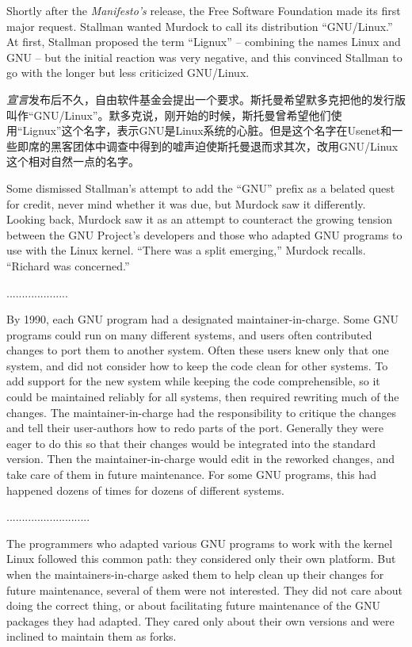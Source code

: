\ifdefined\eng
Shortly after the \textit{Manifesto's} release, the Free Software Foundation made its first major request. Stallman wanted Murdock to call its distribution ``GNU/Linux.'' At first, Stallman proposed the term ``Lignux'' -- combining the names Linux and GNU -- but the initial reaction was very negative, and this convinced Stallman to go with the longer but less criticized GNU/Linux.
\fi

\ifdefined\chs
\textit{宣言}发布后不久，自由软件基金会提出一个要求。斯托曼希望默多克把他的发行版叫作``GNU/Linux''。默多克说，刚开始的时候，斯托曼曾希望他们使用``Lignux''这个名字，表示GNU是Linux系统的心脏。但是这个名字在Usenet和一些即席的黑客团体中调查中得到的嘘声迫使斯托曼退而求其次，改用GNU/Linux这个相对自然一点的名字。
\fi

\ifdefined\eng
Some dismissed Stallman's attempt to add the ``GNU'' prefix as a belated quest for credit, never mind whether it was due, but Murdock saw it differently. Looking back, Murdock saw it as an attempt to counteract the growing tension between the GNU Project's developers and those who adapted GNU programs to use with the Linux kernel. ``There was a split emerging,'' Murdock recalls. ``Richard was concerned.''
\fi

\ifdefined\chs
....................
\fi

\ifdefined\eng
By 1990, each GNU program had a designated maintainer-in-charge.  Some GNU programs could run on many different systems, and users often contributed changes to port them to another system.  Often these users knew only that one system, and did not consider how to keep the code clean for other systems.  To add support for the new system while keeping the code comprehensible, so it could be maintained reliably for all systems, then required rewriting much of the changes.  The maintainer-in-charge had the responsibility to critique the changes and tell their user-authors how to redo parts of the port.  Generally they were eager to do this so that their changes would be integrated into the standard version.  Then the maintainer-in-charge would edit in the reworked changes, and take care of them in future maintenance. For some GNU programs, this had happened dozens of times for dozens
of different systems.
\fi

\ifdefined\chs
...........................
\fi

\ifdefined\eng
The programmers who adapted various GNU programs to work with the kernel Linux followed this common path: they considered only their own platform.  But when the maintainers-in-charge asked them to help clean up their changes for future maintenance, several of them were not interested.  They did not care about doing the correct thing, or about facilitating future maintenance of the GNU packages they had adapted. They cared only about their own versions and were inclined to maintain them as forks.
\fi

